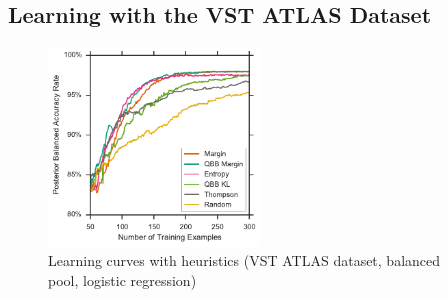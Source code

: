 \clearpage
\subsection{Learning with the VST ATLAS Dataset}

\begin{figure}[p]
	\centering
	\includegraphics[width=0.5\textwidth]{figures/5_active/vstatlas_bl_ind_upper}
	\caption[Learning curves with heuristics (VST ATLAS, balanced, logistic)]{
		Learning curves with heuristics (VST ATLAS dataset, balanced pool, logistic regression)}
	\label{fig:vstatlas_bl_ind_upper}
\end{figure}


